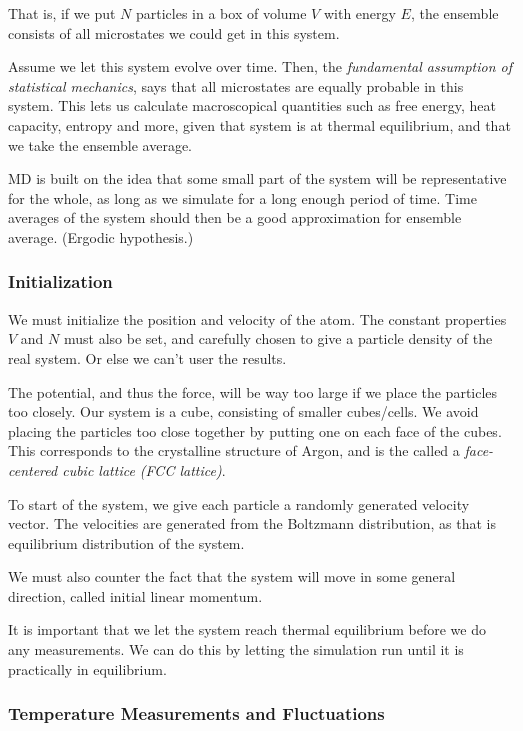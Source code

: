 \documentclass[11pt]{article}
\numberwithin{equation}{section}
\numberwithin{figure}{section}
\newcommand{\ita}[1]{\textit{#1}}
\begin{document}
That is, if we put $N$ particles in a box of volume $V$
with energy $E$, the ensemble consists of all microstates
we could get in this system. 

Assume we let this system evolve over time.
Then, the \ita{fundamental assumption of statistical mechanics},
says that all microstates are equally probable in this system.
This lets us calculate macroscopical quantities such as
free energy, heat capacity, entropy and more, given
that system is at thermal equilibrium, and that we take the
ensemble average.

MD is built on the idea that some small part of the system will
be representative for the whole, as long as we simulate
for a long enough period of time. 
Time averages of the system should then be a good approximation for
ensemble average. (Ergodic hypothesis.)

\subsubsection{Initialization}
We must initialize the position and velocity of the atom.
The constant properties $V$ and $N$ must also be set,
and carefully chosen to give a particle density of the real system.
Or else we can't user the results.

The potential, and thus the force, will be way too large if we place
the particles too closely.
Our system is a cube, consisting of smaller cubes/cells.
We avoid placing the particles too close together
by putting one on each face of the cubes.
This corresponds to the crystalline structure of Argon,
and is the called a 
\ita{face-centered cubic lattice (FCC lattice)}.

To start of the system, we give each particle a randomly
generated velocity vector. The velocities are generated
from the Boltzmann distribution, as that is equilibrium
distribution of the system.

We must also counter the fact that the
system will move in some general direction, 
called initial linear momentum.

It is important that we let the system reach
thermal equilibrium before
we do any measurements. We can do this by
letting the simulation run until it is practically in equilibrium.

\subsubsection{Temperature Measurements and Fluctuations}
\end{document}
